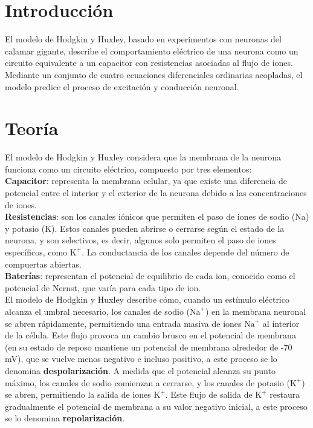 \documentclass[aps,prl,twocolumn,groupedaddress]{revtex4-2}
\begin{document}
\section{Introducción}

El modelo de Hodgkin y Huxley, basado en experimentos con neuronas del calamar gigante, describe el comportamiento eléctrico de una neurona como un circuito equivalente a un capacitor con resistencias asociadas al flujo de iones. Mediante un conjunto de cuatro ecuaciones diferenciales ordinarias acopladas, el modelo predice el proceso de excitación y conducción neuronal.~\cite{HodgkinyHuxleyWikipedia}
\section{Teoría}

El modelo de Hodgkin y Huxley considera que la membrana de la neurona funciona como un circuito eléctrico, compuesto por tres elementos:\\

\textbf{Capacitor}: representa la membrana celular, ya que existe una diferencia de potencial entre el interior y el exterior de la neurona debido a las concentraciones de iones.\\

\textbf{Resistencias}: son los canales iónicos que permiten el paso de iones de sodio (Na) y potasio (K). Estos canales pueden abrirse o cerrarse según el estado de la neurona, y son selectivos, es decir, algunos solo permiten el paso de iones específicos, como $\mathrm{K}^+$. La conductancia de los canales depende del número de compuertas abiertas.\\

\textbf{Baterías}: representan el potencial de equilibrio de cada ion, conocido como el potencial de Nernst, que varía para cada tipo de ion.\\

El modelo de Hodgkin y Huxley describe cómo, cuando un estímulo eléctrico alcanza el umbral necesario, los canales de sodio ($\mathrm{Na}^+$) en la membrana neuronal se abren rápidamente, permitiendo una entrada masiva de iones $\mathrm{Na}^+$  al interior de la célula. Este flujo provoca un cambio brusco en el potencial de membrana (en su estado de reposo mantiene un potencial de membrana alrededor de -70 mV), que se vuelve menos negativo e incluso positivo, a este proceso se lo denomina \textbf{despolarización}. A medida que el potencial alcanza su punto máximo, los canales de sodio comienzan a cerrarse, y los canales de potasio ($\mathrm{K}^+$) se abren, permitiendo la salida de iones $\mathrm{K}^+$. Este flujo de salida de $\mathrm{K}^+$ restaura gradualmente el potencial de membrana a su valor negativo inicial, a este proceso se lo denomina \textbf{repolarización}.
\end{document}
